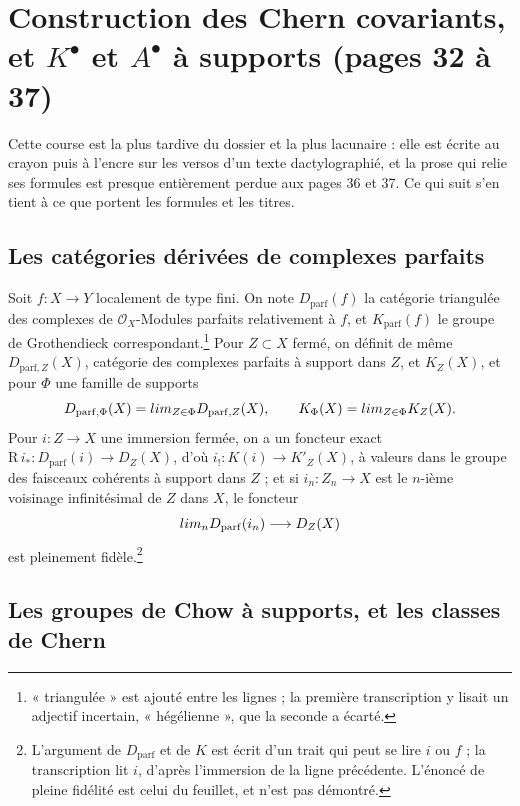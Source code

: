 \documentclass[11pt,a4paper]{article}
\begin{document}
\section*{Construction des Chern covariants, et $K^{\bullet}$ et $A^{\bullet}$ à supports (pages 32 à 37)}

Cette course est la plus tardive du dossier et la plus lacunaire : elle est
écrite au crayon puis à l'encre sur les versos d'un texte dactylographié, et la
prose qui relie ses formules est presque entièrement perdue aux pages 36 et 37.
Ce qui suit s'en tient à ce que portent les formules et les titres.

\subsection*{Les catégories dérivées de complexes parfaits}

Soit $f : X \to Y$ localement de type fini. On note $D_{\mathrm{parf}}(f)$ la
catégorie triangulée des complexes de $\mathcal{O}_{X}$-Modules parfaits
relativement à $f$, et $K_{\mathrm{parf}}(f)$ le groupe de Grothendieck
correspondant.\footnote{« triangulée » est ajouté entre les lignes ; la
première transcription y lisait un adjectif incertain, « hégélienne », que la
seconde a écarté.} Pour $Z \subset X$ fermé, on définit de même
$D_{\mathrm{parf},Z}(X)$, catégorie des complexes parfaits à support dans
$Z$, et $K_{Z}(X)$, et pour $\Phi$ une famille de supports
\[
  D_{\mathrm{parf},\Phi}(X) = \varinjlim_{Z \in \Phi} D_{\mathrm{parf},Z}(X),
  \qquad
  K_{\Phi}(X) = \varinjlim_{Z \in \Phi} K_{Z}(X) .
\]
Pour $i : Z \to X$ une immersion fermée, on a un foncteur exact
$\mathrm{R}\,i_{*} : D_{\mathrm{parf}}(i) \to D_{Z}(X)$, d'où
$i_{!} : K(i) \to K'_{Z}(X)$, à valeurs dans le groupe des faisceaux
cohérents à support dans $Z$ ; et si $i_{n} : Z_{n} \to X$ est le $n$-ième
voisinage infinitésimal de $Z$ dans $X$, le foncteur
\[
  \varinjlim_{n} D_{\mathrm{parf}}(i_{n}) \longrightarrow D_{Z}(X)
\]
est pleinement fidèle.\footnote{L'argument de $D_{\mathrm{parf}}$ et de $K$
est écrit d'un trait qui peut se lire $i$ ou $f$ ; la transcription lit $i$,
d'après l'immersion de la ligne précédente. L'énoncé de pleine fidélité est
celui du feuillet, et n'est pas démontré.}

\subsection*{Les groupes de Chow à supports, et les classes de Chern}
\end{document}
